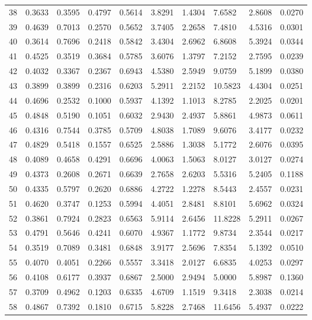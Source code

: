 \begin{longtable}{ p{}  p{}  p{}  p{}  p{} p{}  p{} p{} p{} p{}}
38	&	0.3633	&	0.3595	&	0.4797	&	0.5614	&	3.8291	&	1.4304	&	7.6582	&	2.8608	&	0.0270	\\
39	&	0.4639	&	0.7013	&	0.2570	&	0.5652	&	3.7405	&	2.2658	&	7.4810	&	4.5316	&	0.0301	\\
40	&	0.3614	&	0.7696	&	0.2418	&	0.5842	&	3.4304	&	2.6962	&	6.8608	&	5.3924	&	0.0344	\\
41	&	0.4525	&	0.3519	&	0.3684	&	0.5785	&	3.6076	&	1.3797	&	7.2152	&	2.7595	&	0.0239	\\
42	&	0.4032	&	0.3367	&	0.2367	&	0.6943	&	4.5380	&	2.5949	&	9.0759	&	5.1899	&	0.0380	\\
43	&	0.3899	&	0.3899	&	0.2316	&	0.6203	&	5.2911	&	2.2152	&	10.5823	&	4.4304	&	0.0251	\\
44	&	0.4696	&	0.2532	&	0.1000	&	0.5937	&	4.1392	&	1.1013	&	8.2785	&	2.2025	&	0.0201	\\
45	&	0.4848	&	0.5190	&	0.1051	&	0.6032	&	2.9430	&	2.4937	&	5.8861	&	4.9873	&	0.0611	\\
46	&	0.4316	&	0.7544	&	0.3785	&	0.5709	&	4.8038	&	1.7089	&	9.6076	&	3.4177	&	0.0232	\\
47	&	0.4829	&	0.5418	&	0.1557	&	0.6525	&	2.5886	&	1.3038	&	5.1772	&	2.6076	&	0.0395	\\
48	&	0.4089	&	0.4658	&	0.4291	&	0.6696	&	4.0063	&	1.5063	&	8.0127	&	3.0127	&	0.0274	\\
49	&	0.4373	&	0.2608	&	0.2671	&	0.6639	&	2.7658	&	2.6203	&	5.5316	&	5.2405	&	0.1188	\\
50	&	0.4335	&	0.5797	&	0.2620	&	0.6886	&	4.2722	&	1.2278	&	8.5443	&	2.4557	&	0.0231	\\
51	&	0.4620	&	0.3747	&	0.1253	&	0.5994	&	4.4051	&	2.8481	&	8.8101	&	5.6962	&	0.0324	\\
52	&	0.3861	&	0.7924	&	0.2823	&	0.6563	&	5.9114	&	2.6456	&	11.8228	&	5.2911	&	0.0267	\\
53	&	0.4791	&	0.5646	&	0.4241	&	0.6070	&	4.9367	&	1.1772	&	9.8734	&	2.3544	&	0.0217	\\
54	&	0.3519	&	0.7089	&	0.3481	&	0.6848	&	3.9177	&	2.5696	&	7.8354	&	5.1392	&	0.0510	\\
55	&	0.4070	&	0.4051	&	0.2266	&	0.5557	&	3.3418	&	2.0127	&	6.6835	&	4.0253	&	0.0297	\\
56	&	0.4108	&	0.6177	&	0.3937	&	0.6867	&	2.5000	&	2.9494	&	5.0000	&	5.8987	&	0.1360	\\
57	&	0.3709	&	0.4962	&	0.1203	&	0.6335	&	4.6709	&	1.1519	&	9.3418	&	2.3038	&	0.0214	\\
58	&	0.4867	&	0.7392	&	0.1810	&	0.6715	&	5.8228	&	2.7468	&	11.6456	&	5.4937	&	0.0222	\\

\end{longtable}
